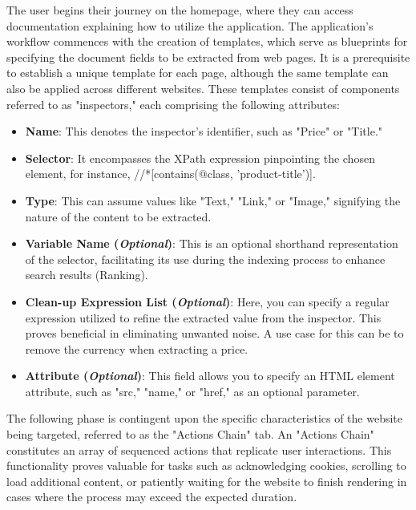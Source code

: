 The user begins their journey on the homepage, where they can access documentation explaining how to utilize the application. The application's workflow commences with the creation of templates, which serve as blueprints for specifying the document fields to be extracted from web pages. It is a prerequisite to establish a unique template for each page, although the same template can also be applied across different websites. These templates consist of components referred to as "inspectors," each comprising the following attributes:

\begin{itemize}
  \item \textbf{Name}: This denotes the inspector's identifier, such as "Price" or "Title."

\item \textbf{Selector}: It encompasses the XPath expression pinpointing the chosen element, for instance, //*[contains(@class, 'product-title')].

\item \textbf{Type}: This can assume values like "Text," "Link," or "Image," signifying the nature of the content to be extracted.

\item \textbf{Variable Name (\textit{Optional})}: This is an optional shorthand representation of the selector, facilitating its use during the indexing process to enhance search results (Ranking).

\item \textbf{Clean-up Expression List (\textit{Optional})}: Here, you can specify a regular expression utilized to refine the extracted value from the inspector. This proves beneficial in eliminating unwanted noise. A use case for this can be to remove the currency when extracting a price.

\item \textbf{Attribute (\textit{Optional})}: This field allows you to specify an HTML element attribute, such as "src," "name," or "href," as an optional parameter.
\end{itemize}


The following phase is contingent upon the specific characteristics of the website being targeted, referred to as the "Actions Chain" tab. An "Actions Chain" constitutes an array of sequenced actions that replicate user interactions. This functionality proves valuable for tasks such as acknowledging cookies, scrolling to load additional content, or patiently waiting for the website to finish rendering in cases where the process may exceed the expected duration.

